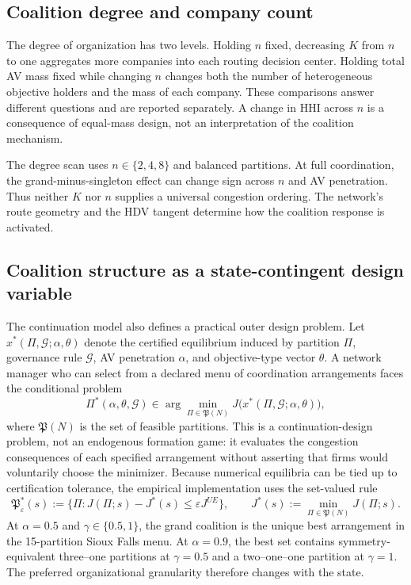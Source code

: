 \subsection{Coalition degree and company count}

The degree of organization has two levels. Holding $n$ fixed, decreasing $K$ from $n$ to one aggregates more companies into each routing decision center. Holding total AV mass fixed while changing $n$ changes both the number of heterogeneous objective holders and the mass of each company. These comparisons answer different questions and are reported separately. A change in HHI across $n$ is a consequence of equal-mass design, not an interpretation of the coalition mechanism.

The degree scan uses $n\in\{2,4,8\}$ and balanced partitions. At full coordination, the grand-minus-singleton effect can change sign across $n$ and AV penetration. Thus neither $K$ nor $n$ supplies a universal congestion ordering. The network's route geometry and the HDV tangent determine how the coalition response is activated.

\subsection{Coalition structure as a state-contingent design variable}

The continuation model also defines a practical outer design problem. Let
$x^*(\Pi,\mathcal G;\alpha,\theta)$ denote the certified equilibrium induced by
partition $\Pi$, governance rule $\mathcal G$, AV penetration $\alpha$, and
objective-type vector $\theta$. A network manager who can select from a declared
menu of coordination arrangements faces the conditional problem
\begin{equation}\label{eq:coalition-design-outer}
 \Pi^*(\alpha,\theta,\mathcal G)
 \in\arg\min_{\Pi\in\mathfrak P(N)}J\bigl(x^*(\Pi,\mathcal G;\alpha,\theta)\bigr),
 \end{equation}
where $\mathfrak P(N)$ is the set of feasible partitions. This is a
continuation-design problem, not an endogenous formation game: it evaluates the
congestion consequences of each specified arrangement without asserting that
firms would voluntarily choose the minimizer. Because numerical equilibria can
be tied up to certification tolerance, the empirical implementation uses the
set-valued rule
\begin{equation}\label{eq:epsilon-optimal-partitions}
 \mathfrak P_\varepsilon^*(s)
 :=\{\Pi:J(\Pi;s)-J^*(s)\leq\varepsilon J^{UE}\},
 \qquad J^*(s):=\min_{\Pi\in\mathfrak P(N)}J(\Pi;s).
\end{equation}
At $\alpha=0.5$ and $\gamma\in\{0.5,1\}$, the grand coalition is the unique
best arrangement in the 15-partition Sioux Falls menu. At $\alpha=0.9$, the
best set contains symmetry-equivalent three--one partitions at $\gamma=0.5$
and a two--one--one partition at $\gamma=1$. The preferred organizational
granularity therefore changes with the state.


